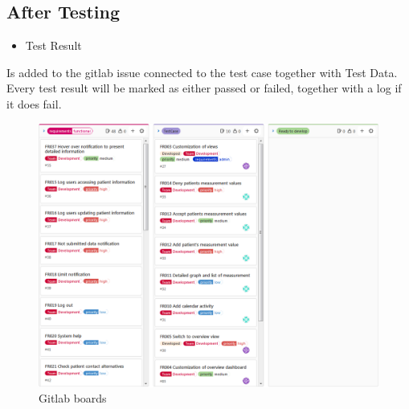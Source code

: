 \subsection{After Testing}
\begin{itemize}
    \item Test Result
\end{itemize}
Is added to the gitlab issue connected to the test case together with Test Data. Every test result will be marked as either passed or failed, together with a log if it does fail.

\begin{figure}

    \centering
    \includegraphics[scale=0.5]{Pictures/gitlab.PNG}
    \caption{Gitlab boards}
\end{figure}
